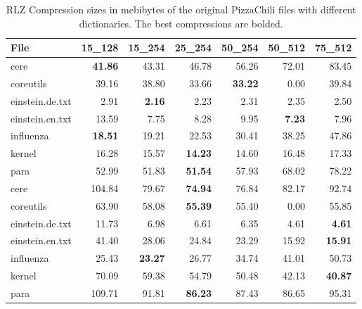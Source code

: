 \documentclass[english,twoside,censored,csm,algorithms-track-2020]{HYthesisML}
\theoremstyle{plain}
\theoremstyle{definition}
\begin{document}
\begin{center}
  \begin{table}
  \begin{tabular} {|l|r r r r r r|}
    \hline
     \textbf{File} & \textbf{15\_128} & \textbf{15\_254} & \textbf{25\_254}  &\textbf{50\_254} & \textbf{50\_512} & \textbf{75\_512} \\
     \hline

     cere            & \textbf{41.86} & 43.31          & 46.78          & 56.26          & 72.01          & 83.45 \\
     coreutils       & 39.16          & 38.80          & 33.66          & \textbf{33.22} & 0.00           & 39.84 \\
     einstein.de.txt & 2.91           & \textbf{2.16}  & 2.23           & 2.31           & 2.35           & 2.50  \\
     einstein.en.txt & 13.59          & 7.75           & 8.28           & 9.95           & \textbf{7.23}  & 7.96  \\
     influenza       & \textbf{18.51} & 19.21          & 22.53          & 30.41          & 38.25          & 47.86 \\
     kernel          & 16.28          & 15.57          & \textbf{14.23} & 14.60          & 16.48          & 17.33 \\
     para            & 52.99          & 51.83          & \textbf{51.54} & 57.93          & 68.02          & 78.22 \\

     \hline

     cere            & 104.84 & 79.67          & \textbf{74.94} & 76.84 & 82.17          & 92.74          \\
     coreutils       & 63.90  & 58.08          & \textbf{55.39} & 55.40 & 0.00           & 55.85          \\
     einstein.de.txt & 11.73  & 6.98           & 6.61           & 6.35  & 4.61           & \textbf{4.61}  \\
     einstein.en.txt & 41.40  & 28.06          & 24.84          & 23.29 & 15.92          & \textbf{15.91} \\
     influenza       & 25.43  & \textbf{23.27} & 26.77          & 34.74 & 41.01          & 50.73          \\
     kernel          & 70.09  & 59.38          & 54.79          & 50.48 & 42.13          & \textbf{40.87} \\
     para            & 109.71 & 91.81          & \textbf{86.23} & 87.43 & 86.65          & 95.31          \\
     
     \hline

  \end{tabular}
  \caption{RLZ Compression sizes in mebibytes of the original PizzaChili files with different dictionaries.
  The best compressions are bolded.}
  \label{tbl-total-sizes}
  \end{table}
\end{center}
\end{document}
